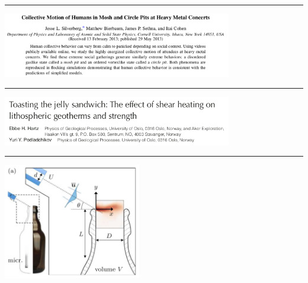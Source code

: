 \par\noindent\rule{\textwidth}{0.4pt}
\begin{center}
\includegraphics[width=10cm]{images/interesting/sibs13} {\tiny \cite{sibs13}}
\end{center}

\par\noindent\rule{\textwidth}{0.4pt}
\begin{center}
\includegraphics[width=10cm]{images/interesting/hapo08} {\tiny \cite{hapo08}}
\end{center}

\par\noindent\rule{\textwidth}{0.4pt}
\begin{center}
\includegraphics[width=6cm]{images/interesting/bobx20} {\tiny \cite{bobx20}}
\end{center}
